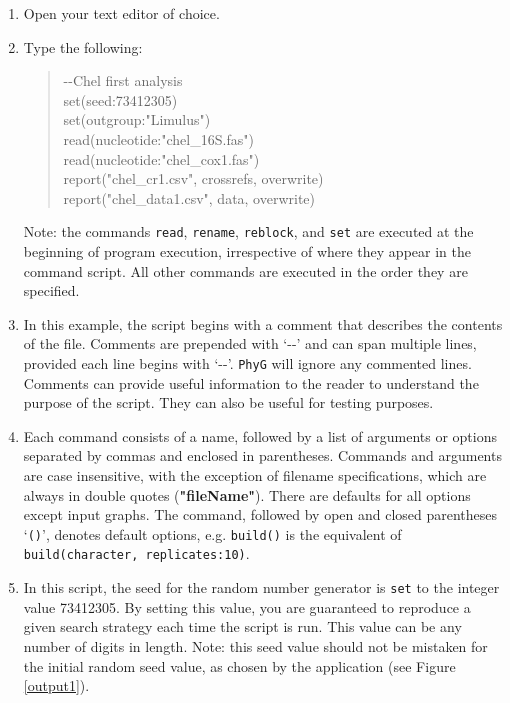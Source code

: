 \documentclass[11pt]{article}
\newcommand{\phyg}{\texttt{PhyG} }
\begin{document}
\begin{enumerate}

\item Open your text editor of choice.

\item Type the following:
	
	\begin{quote}
	-\/-Chel first analysis\\
	set(seed:73412305)\\
	set(outgroup:"Limulus")\\
	read(nucleotide:"chel\_16S.fas")\\
	read(nucleotide:"chel\_cox1.fas")\\
	report("chel\_cr1.csv", crossrefs, overwrite)\\
	report("chel\_data1.csv", data, overwrite)\\
	\end{quote}

Note: the commands \texttt{read}, \texttt{rename}, \texttt{reblock}, and \texttt{set} 
are executed at the beginning of program execution, irrespective of where they 
appear in the command script. All other commands are executed in the order they 
are specified.

\item In this example, the script begins with a comment that describes the 
contents of the file. Comments are prepended with `-{}-' and can span multiple 
lines, provided each line begins with `-{}-'. \phyg will ignore any commented 
lines. Comments can provide useful information to the reader to understand 
the purpose of the script. They can also be useful for testing purposes.

\item Each command consists of a name, followed by a list of arguments or options 
separated by commas and enclosed in parentheses. Commands and arguments are 
case insensitive, with the exception of filename specifications, which are always in 
double quotes (\textbf{"fileName"}). There are defaults for all options except 
input graphs. The command, followed by open and closed parentheses `\texttt{()}',
denotes default options, e.g. \texttt{build()} is the equivalent of \texttt{build(character, 
replicates:10)}.

\item In this script, the seed for the random number generator is \texttt{set} to 
the integer value 73412305. By setting this value, you are guaranteed to reproduce 
a given search strategy each time the script is run. This value can be any number of 
digits in length. Note: this seed value should not be mistaken for the initial random
seed value, as chosen by the application (see Figure \ref{output1}).


\end{enumerate}
\end{document}
